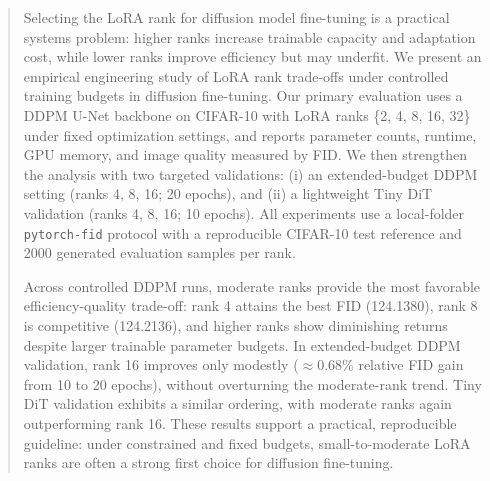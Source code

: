 \begin{abstract}
Selecting the LoRA rank for diffusion model fine-tuning is a practical systems problem: higher ranks increase trainable capacity and adaptation cost, while lower ranks improve efficiency but may underfit. We present an empirical engineering study of LoRA rank trade-offs under controlled training budgets in diffusion fine-tuning. Our primary evaluation uses a DDPM U-Net backbone on CIFAR-10 with LoRA ranks \{2, 4, 8, 16, 32\} under fixed optimization settings, and reports parameter counts, runtime, GPU memory, and image quality measured by FID. We then strengthen the analysis with two targeted validations: (i) an extended-budget DDPM setting (ranks 4, 8, 16; 20 epochs), and (ii) a lightweight Tiny DiT validation (ranks 4, 8, 16; 10 epochs). All experiments use a local-folder \texttt{pytorch-fid} protocol with a reproducible CIFAR-10 test reference and 2000 generated evaluation samples per rank.

Across controlled DDPM runs, moderate ranks provide the most favorable efficiency-quality trade-off: rank 4 attains the best FID (\num{124.1380}), rank 8 is competitive (\num{124.2136}), and higher ranks show diminishing returns despite larger trainable parameter budgets. In extended-budget DDPM validation, rank 16 improves only modestly (\(\approx\)0.68\% relative FID gain from 10 to 20 epochs), without overturning the moderate-rank trend. Tiny DiT validation exhibits a similar ordering, with moderate ranks again outperforming rank 16. These results support a practical, reproducible guideline: under constrained and fixed budgets, small-to-moderate LoRA ranks are often a strong first choice for diffusion fine-tuning.
\end{abstract}

